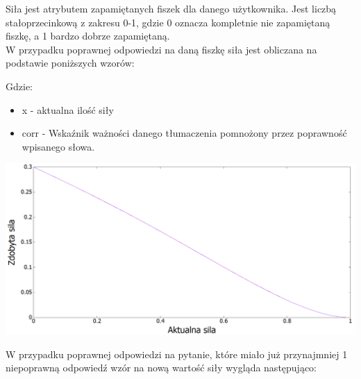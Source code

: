 Siła jest atrybutem zapamiętanych fiszek dla danego użytkownika. Jest liczbą stałoprzecinkową z zakresu 0-1, gdzie 0 oznacza kompletnie nie zapamiętaną fiszkę, a 1 bardzo dobrze zapamiętaną.  \\
W przypadku poprawnej odpowiedzi na daną fiszkę siła jest obliczana na podstawie poniższych wzorów:  \\


Gdzie:
\begin{itemize}
	\item x - aktualna ilość siły
	\item corr - Wskaźnik ważności danego tłumaczenia pomnożony przez poprawność wpisanego słowa.
\end{itemize}


\begin{center}
	\centering
	\includegraphics[width=\textwidth]{images/WinStrength.png}
\end{center}

W przypadku poprawnej odpowiedzi na pytanie, które miało już przynajmniej 1 niepoprawną odpowiedź wzór na nową wartość siły wygląda następująco: \\


